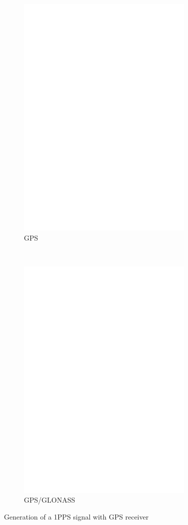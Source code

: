\begin{figure}[H]
  \begin{subfigure}[b]{9cm}
    \centering
    \includegraphics[width=8.5cm]{../FIG/GPS_UP501.eps}
    \caption{GPS}
  \end{subfigure}
  ~
  \begin{subfigure}[b]{9cm}
    \centering
    \includegraphics[width=8.5cm]{../FIG/GPS_GNS701.eps}
    \caption{GPS/GLONASS}
  \end{subfigure}
  \caption{Generation of a 1PPS signal with GPS receiver }
  \label{fig:GPS-1PPS}
\end{figure}

